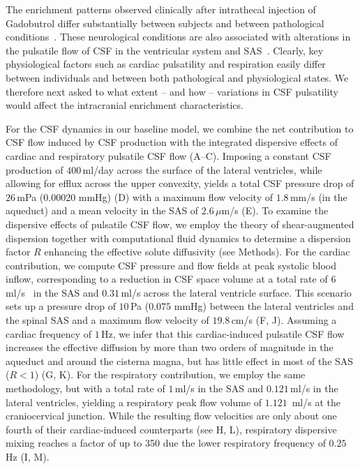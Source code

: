 \documentclass[fleqn,10pt]{wlscirep}
\begin{document}
The enrichment patterns observed clinically after intrathecal
injection of Gadobutrol differ substantially between subjects and
between pathological conditions~\cite{ringstad2018brain,
  eide2021direction, eide2021impaired, eide2022altered}. These
neurological conditions are also associated with alterations in the
pulsatile flow of CSF in the ventricular system and
SAS~\cite{eide2021direction}. Clearly, key physiological factors such
as cardiac pulsatility and respiration easily differ between
individuals and between both pathological and physiological states. We
therefore next asked to what extent -- and how -- variations in CSF
pulsatility would affect the intracranial enrichment characteristics.

For the CSF dynamics in our baseline model, we combine the net
contribution to CSF flow induced by CSF production with the integrated
dispersive effects of cardiac and respiratory pulsatile CSF flow
(A--C). Imposing a constant CSF production of
$400\,$ml/day across the surface of the lateral ventricles, while
allowing for efflux across the upper convexity, yields a total CSF
pressure drop of $26\,$mPa (0.00020 mmHg) (D) with a
maximum flow velocity of $1.8\,$mm/s (in the aqueduct) and a mean
velocity in the SAS of $2.6\,\mu$m/s (E). To examine the
dispersive effects of pulsatile CSF flow, we employ the theory of
shear-augmented dispersion together with computational fluid dynamics
to determine a dispersion factor $R$ enhancing the effective solute
diffusivity (see Methods). For the cardiac contribution, we compute
CSF pressure and flow fields at peak systolic blood inflow,
corresponding to a reduction in CSF space volume at a total rate of
$6\,$ml/s~\cite{baledent2014imaging, causemann2022human} in
  the SAS and $0.31\,$ml/s across the lateral ventricle
surface\cite{vinje2019respiratory}. This scenario sets up a pressure
drop of $10\,$Pa ($0.075$ mmHg) between the lateral ventricles and the
spinal SAS and a maximum flow velocity of $19.8\,$cm/s
(F, J). Assuming a cardiac frequency of $1\,$Hz, we
infer that this cardiac-induced pulsatile CSF flow increases the
effective diffusion by more than two orders of magnitude in the
aqueduct and around the cisterna magna, but has little effect in most
of the SAS ($R < 1$) (G, K). For the respiratory
contribution, we employ the same methodology, but with a total rate of
$1\,$ml/s \cite{gutierrez2022effect} in the SAS and
$0.121\,$ml/s \cite{liu2024using} in the lateral
  ventricles, yielding a respiratory peak flow volume of $1.121\,$
ml/s at the craniocervical junction. While
the resulting flow velocities are only about one fourth of their
cardiac-induced counterparts (see H, L), respiratory
dispersive mixing reaches a factor of up to 350 due the lower
respiratory frequency of $0.25\,$Hz (I, M).
\end{document}
